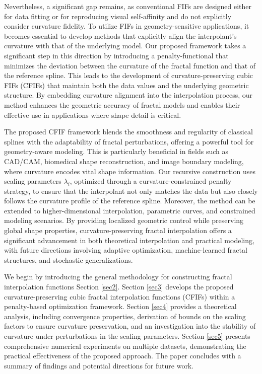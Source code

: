\documentclass[runningheads]{llncs}
\begin{document}
	\par Nevertheless, a significant gap remains, as conventional FIFs are designed either for data fitting or for reproducing visual self-affinity and do not explicitly consider curvature fidelity. To utilize FIFs in geometry-sensitive applications, it becomes essential to develop methods that explicitly align the interpolant’s curvature with that of the underlying model. Our proposed framework takes a significant step in this direction by introducing a penalty-functional that minimizes the deviation between the curvature of the fractal function and that of the reference spline. This leads to the development of curvature-preserving cubic FIFs (CFIFs) that maintain both the data values and the underlying geometric structure. By embedding curvature alignment into the interpolation process, our method enhances the geometric accuracy of fractal models and enables their effective use in applications where shape detail is critical.
	
	\par The proposed CFIF framework blends the smoothness and regularity of classical splines with the adaptability of fractal perturbations, offering a powerful tool for geometry-aware modeling. This is particularly beneficial in fields such as CAD/CAM, biomedical shape reconstruction, and image boundary modeling, where curvature encodes vital shape information. Our recursive construction uses scaling parameters $\lambda_i$, optimized through a curvature-constrained penalty strategy, to ensure that the interpolant not only matches the data but also closely follows the curvature profile of the reference spline. Moreover, the method can be extended to higher-dimensional interpolation, parametric curves, and constrained modeling scenarios. By providing localized geometric control while preserving global shape properties, curvature-preserving fractal interpolation offers a significant advancement in both theoretical interpolation and practical modeling, with future directions involving adaptive optimization, machine-learned fractal structures, and stochastic generalizations.
	
	\par We begin by introducing the general methodology for constructing fractal interpolation functions Section \ref{sec2}. Section \ref{sec3} develops the proposed curvature-preserving cubic fractal interpolation functions (CFIFs) within a penalty-based optimization framework. Section \ref{sec4} provides a theoretical analysis, including convergence properties, derivation of bounds on the scaling factors to ensure curvature preservation, and an investigation into the stability of curvature under perturbations in the scaling parameters. Section \ref{sec5} presents comprehensive numerical experiments on multiple datasets, demonstrating the practical effectiveness of the proposed approach. The paper concludes with a summary of findings and potential directions for future work.
	
\end{document}
